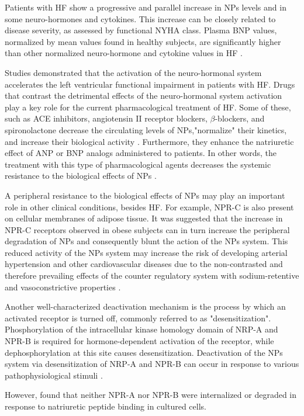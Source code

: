 \documentclass[14pt,a4paper,onecolumn]{extarticle}
\begin{document}
Patients with HF show a progressive and parallel increase in NPs levels and in some neuro-hormones and cytokines. This increase can be closely related to disease severity, as assessed by functional NYHA class. Plasma BNP values, normalized by mean values found in healthy subjects, are significantly higher than other normalized neuro-hormone and cytokine values in HF \citep{bib360}. %

Studies demonstrated that the activation of the neuro-hormonal system accelerates the left ventricular functional impairment in patients with HF. Drugs that contrast the detrimental effects of the neuro-hormonal system activation play a key role for the current pharmacological treatment of HF. Some of these, such as ACE inhibitors, angiotensin II receptor blockers, $\beta$-blockers, and spironolactone decrease the circulating levels of NPs,"normalize" their kinetics, and increase their biological activity \citep{bib35}. Furthermore, they enhance the natriuretic effect of ANP or BNP analogs administered to patients. In other words, the treatment with this type of pharmacological agents decreases the systemic resistance to the biological effects of NPs \citep{bib333}. %

A peripheral resistance to the biological effects of NPs may play an important role in other clinical conditions, besides HF. For example, NPR-C is also present on cellular membranes of adipose tissue. It was suggested that the increase in NPR-C receptors observed in obese subjects can in turn increase the peripheral degradation of NPs and consequently blunt the action of the NPs system. This reduced activity of the NPs system may increase the risk of developing arterial hypertension and other cardiovascular diseases due to the non-contrasted and therefore prevailing effects of the counter regulatory system with sodium-retentive and vasoconstrictive properties \citep{bib352}. %

Another well-characterized deactivation mechanism is the process by which an activated receptor is turned off, commonly referred to as "desensitization". Phosphorylation of the intracellular kinase homology domain of NRP-A and NPR-B is required for hormone-dependent activation of the receptor, while dephosphorylation at this site causes desensitization. Deactivation of the NPs system via desensitization of NRP-A and NPR-B can occur in response to various pathophysiological stimuli \citep{bib348}.%

However,  \citep{bib348} found that neither NPR-A nor NPR-B were internalized or degraded in response to natriuretic peptide binding in cultured cells. %
\end{document}
